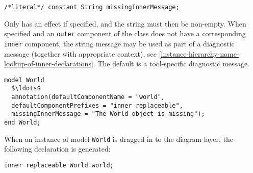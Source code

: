 \begin{annotationdefinition}[missingInnerMessage]
\begin{synopsis}\begin{lstlisting}
/*literal*/ constant String missingInnerMessage;
\end{lstlisting}\end{synopsis}
\begin{semantics}
Only has an effect if specified, and the string must then be non-empty.
When specified and an \lstinline!outer! component of the class does not have a corresponding \lstinline!inner! component, the string message may be used as part of a diagnostic message (together with appropriate context), see \cref{instance-hierarchy-name-lookup-of-inner-declarations}.
The default is a tool-specific diagnostic message.

\begin{example}
\begin{lstlisting}[language=modelica]
model World
  $\ldots$
  annotation(defaultComponentName = "world",
  defaultComponentPrefixes = "inner replaceable",
  missingInnerMessage = "The World object is missing");
end World;
\end{lstlisting}
When an instance of model \lstinline!World! is dragged in to the diagram layer, the following declaration is generated:
\begin{lstlisting}[language=modelica]
inner replaceable World world;
\end{lstlisting}
\end{example}
\end{semantics}
\end{annotationdefinition}

